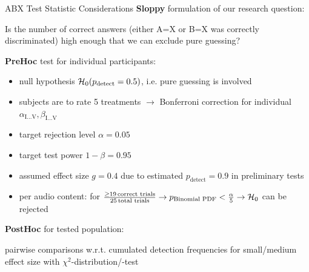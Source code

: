 \documentclass[mathserif]{intbeamer}
\begin{document}
\begin{frame}{ABX Test Statistic Considerations}
\textbf{Sloppy} formulation of our research question:

Is the number of correct answers (either A=X or B=X was correctly discriminated)
high enough that we can exclude pure guessing?
\vspace{0.25cm}

\textbf{PreHoc} test for individual participants:
\begin{itemize}
\item
null hypothesis $\mathcal{H}_{0}(p_\text{detect}=0.5)$, i.e. pure guessing is involved
\item
subjects are to rate 5 treatments $\rightarrow$ Bonferroni correction for individual $\alpha_\text{I...V}, \beta_\text{I...V}$
\item
target rejection level $\alpha=0.05$
\item
target test power $1-\beta = 0.95$

\item
assumed effect size $g=0.4$ due to estimated $p_\text{detect}=0.9$ in preliminary tests
\item
\textcolor{colnonzero}{per audio content}:
for $\frac{\geq 19\,\text{correct trials}}{25\,\text{total trials}}
\rightarrow p_\text{Binomial PDF}<\frac{\alpha}{5} \rightarrow\mathcal{H}_{0}$
can be rejected
\end{itemize}
%
\vspace{0.25cm}

\textbf{PostHoc} for tested population:

pairwise comparisons w.r.t. cumulated detection frequencies for small/medium effect size
with $\chi^2$-distribution/-test
\end{frame}
%
%
%
\end{document}

